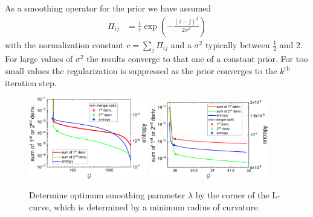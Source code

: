 As a smoothing operator for the prior we have assumed
\begin{align}\label{eq:smoothingOp4prior}
  \Pi_{ij} &= \frac{1}{c}\exp\left(-\frac{(i-j)^2}{2\sigma^2}\right)
\end{align}
with the normalization constant $c=\sum_j \Pi_{ij}$ and a $\sigma^2$ typically between $\frac12$ and 2. For large values of $\sigma^2$ the results converge to that one of a constant prior. For too small values the regularization is suppressed as the prior converges to the $k^\mathrm{th}$ iteration step.

\begin{figure}[htb]
\centering
\includegraphics[width=0.46\textwidth]{../images/form_factor/EM/EMconstLcurve.png}
\includegraphics[width=0.46\textwidth]{../images/form_factor/EM/EMadaptiveLcurve.png}
\caption{Determine optimum smoothing parameter $\lambda$ by the corner of the L-curve, which is determined by a minimum radius of curvature.\label{fig:EMlambdaLcurve}}
\end{figure}

